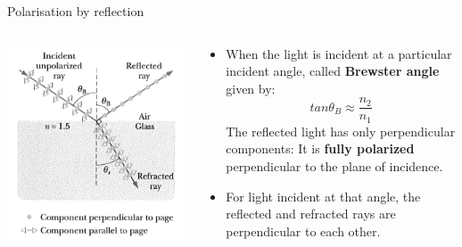 \begin{frame}{Polarisation by reflection}
\begin{columns}
  \begin{column}{0.30\textwidth}
   \begin{center}
      \includegraphics[width=0.99\textwidth]{./images/schematics/polarization_by_reflection}\\
   \end{center}
  \end{column}
  \begin{column}{0.70\textwidth}
   \begin{itemize}
    \item
     When the light is incident at a particular incident angle, called {\bf Brewster angle}
     given by:
     \begin{equation*}
          tan\theta_B \approx \frac{n_2}{n_1}
      \end{equation*}
      The reflected light has only perpendicular components: It is
      {\bf fully polarized} perpendicular to the plane of incidence.
    \item
       For light incident at that angle, the reflected and refracted rays are perpendicular to each other.
   \end{itemize}
  \end{column}
\end{columns}

\end{frame}


